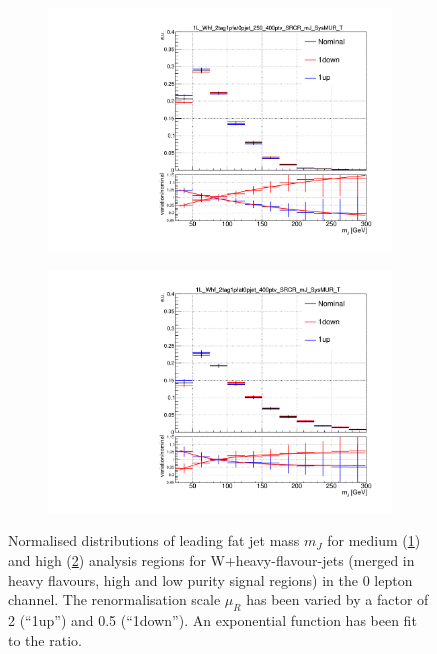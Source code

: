 \begin{figure}[!htbp]
    \centering
    \begin{subfigure}{.5\textwidth}
      \centering
      \includegraphics[width=\textwidth]{chapters/6.vhbb_boosted/figs/1L_Whf_2tag1pfat0pjet_250_400ptv_SRCR_mJ_SysMUR_T_Norm.pdf}
      \caption{}
      \label{fig:vhbb muR shape fitted sub1}
    \end{subfigure}%
    \begin{subfigure}{.5\textwidth}
      \centering
      \includegraphics[width=\textwidth]{chapters/6.vhbb_boosted/figs/1L_Whf_2tag1pfat0pjet_400ptv_SRCR_mJ_SysMUR_T_Norm.pdf}
      \caption{}
      \label{fig:vhbb muR shape fitted sub2}
    \end{subfigure}
    \vspace{-0.5em}
    \caption{Normalised distributions of leading fat jet mass $m_J$ for medium (\cref{fig:vhbb muR shape fitted sub1}) and high (\cref{fig:vhbb muR shape fitted sub2}) \pTV analysis regions for W+heavy-flavour-jets (merged in heavy flavours, high and low purity signal regions) in the 0 lepton channel. The renormalisation scale $\mu_R$ has been varied by a factor of 2 (``1up'') and 0.5 (``1down''). An exponential function has been fit to the ratio.}
    \label{fig:vhbb muR shape fitted}
\end{figure}

